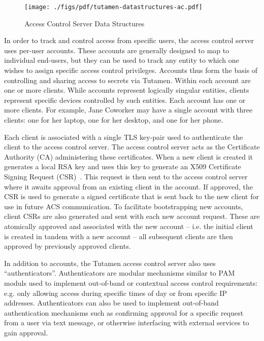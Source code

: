 \begin{figure}[th]
  \centering
  \texttt{[image: ./figs/pdf/tutamen-datastructures-ac.pdf]}
  \caption{Access Control Server Data Structures}
  \label{fig:tutamen:acstructs}
\end{figure}

In order to track and control access from specific users, the access
control server uses per-user accounts. These accounts are generally
designed to map to individual end-users, but they can be used to track
any entity to which one wishes to assign specific
access control privileges. Accounts thus form the basis of controlling
and sharing access to secrets via Tutamen. Within each account are one
or more clients. While accounts represent logically singular entities, 
clients represent specific devices controlled by such entities. Each
account has one or more clients. For example, Jane Coworker may have a
single account with three clients: one for her laptop, one for her
desktop, and one for her phone.

Each client is associated with a single TLS key-pair used to
authenticate the client to the access control server. The access
control server acts as the Certificate Authority (CA) administering
these certificates. When a new client is created it generates a local
RSA key and uses this key to generate an X509 Certificate Signing
Request (CSR)~\cite{rfc5280}. This request is then sent to the access
control server where it awaits approval from an existing client in the
account. If approved, the CSR is used to generate a signed certificate
that is sent back to the new client for use in future ACS
communication. To facilitate bootstrapping new accounts, client CSRs
are also generated and sent with each new account request. These are
atomically approved and associated with the new account -- i.e. the
initial client is created in tandem with a new account -- all
subsequent clients are then approved by previously approved clients.

In addition to accounts, the Tutamen access control server also uses
``authenticators''. Authenticators are modular mechanisms similar
to PAM~\cite{samar1996} moduls used to
implement out-of-band or contextual access control requirements:
e.g. only allowing access during specific times of day or from
specific IP addresses. Authenticators can also be used to implement
out-of-band authentication mechanisms such as confirming approval for
a specific request from a user via text message, or otherwise
interfacing with external services to gain approval.

